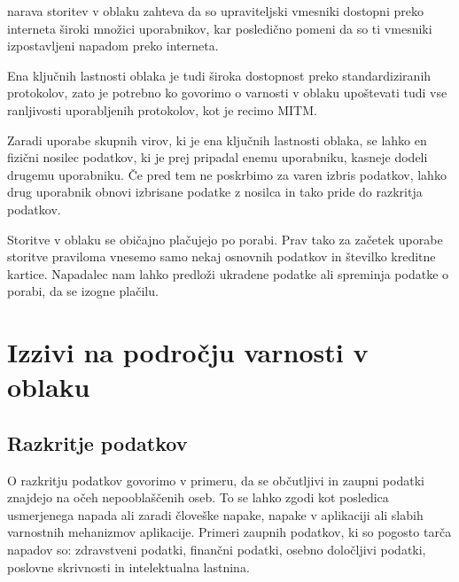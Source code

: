 \documentclass[12pt,a4paper,openany,tikz]{book}
\theoremstyle{plain}
\theoremstyle{definition}
\begin{document}
\begin{description}[style=nextline]

\item[Nedovoljen dostop do upraviteljskega in programskega vmesnika] narava storitev v oblaku zahteva da so upraviteljski vmesniki dostopni preko interneta široki množici uporabnikov, kar posledično pomeni da so ti vmesniki izpostavljeni napadom preko interneta.

\item[Ranljivosti Internetnega protokola] Ena ključnih lastnosti oblaka je tudi široka dostopnost preko standardiziranih protokolov, zato je potrebno ko govorimo o varnosti v oblaku upoštevati tudi vse ranljivosti uporabljenih protokolov, kot je recimo \gls{MITM}.

\item[Ranljivosti obnovitve podatkov] Zaradi uporabe skupnih virov, ki je ena ključnih lastnosti oblaka, se lahko en fizični nosilec podatkov, ki je prej pripadal enemu uporabniku, kasneje dodeli drugemu uporabniku. Če pred tem ne poskrbimo za varen izbris podatkov, lahko drug uporabnik obnovi izbrisane podatke z nosilca in tako pride do razkritja podatkov.

\item[Izogibanje merjenju in plačilu] Storitve v oblaku se običajno plačujejo po porabi. Prav tako za začetek uporabe storitve praviloma vnesemo samo nekaj osnovnih podatkov in številko kreditne kartice. Napadalec nam lahko predloži ukradene podatke ali spreminja podatke o porabi, da se izogne plačilu.

\end{description}

\section{Izzivi na področju varnosti v oblaku}
\label{sec:Izzivi na področju varnosti v oblaku}

\subsection{Razkritje podatkov}
\label{sub:Razkritje podatkov}

O razkritju podatkov govorimo v primeru, da se občutljivi in zaupni podatki znajdejo na očeh nepooblaščenih oseb.  To se lahko zgodi kot posledica usmerjenega napada ali zaradi človeške napake, napake v aplikaciji ali slabih varnostnih mehanizmov aplikacije. Primeri zaupnih podatkov, ki so pogosto tarča napadov so: zdravstveni podatki, finančni podatki, osebno določljivi podatki, poslovne skrivnosti in intelektualna lastnina.
\end{document}
